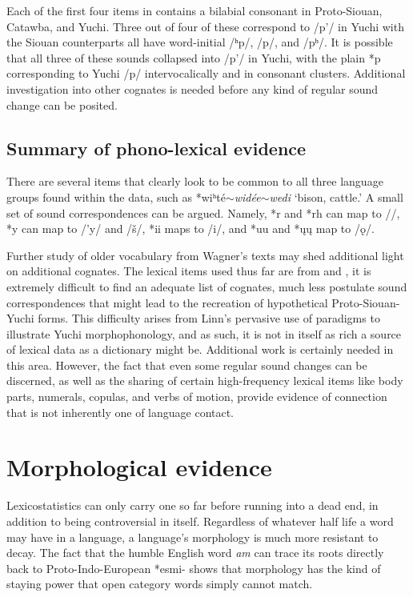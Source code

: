\documentclass[output=paper]{LSP/langsci}
\begin{document}
Each of the first four items in  contains a bilabial consonant in Proto-Siouan, Catawba, and Yuchi. Three out of four of these correspond to /p'/ in Yuchi with the Siouan counterparts all have word-initial /ʰp/, /p/, and /pʰ/. It is possible that all three of these sounds collapsed into /p'/ in Yuchi, with the plain *p corresponding to Yuchi /p/ intervocalically and in consonant clusters. Additional investigation into other cognates is needed before any kind of regular sound change can be posited.

\subsection{Summary of phono-lexical evidence}

There are several items that clearly look to be common to all three language groups found within the data, such as *wiʰt\'e$\sim$\emph{wid\'ee}$\sim$\emph{wedi} `bison, cattle.' A small set of sound correspondences can be argued. Namely, *r and *rh can map to /\textbeltl/, *y can map to /'y/ and /\v{s}/, *ii maps to /i/, and *uu and *\k{u}\k{u} map to /\k{o}/. 

Further study of older vocabulary from Wagner's \citeyear{Wagner1931} texts may shed additional light on additional cognates. The lexical items used thus far are from \citet{Linn2000} and \citet{CarterEtAlND}, it is extremely difficult to find an adequate list of cognates, much less postulate sound correspondences that might lead to the recreation of hypothetical Proto-Siouan-Yuchi forms. This difficulty arises from Linn's pervasive use of paradigms to illustrate Yuchi morphophonology, and as such, it is not in itself as rich a source of lexical data as a dictionary might be. Additional work is certainly needed in this area. However, the fact that even some regular sound changes can be discerned, as well as the sharing of certain high-frequency lexical items like body parts, numerals, copulas, and verbs of motion, provide evidence of connection that is not inherently one of language contact.

\section{Morphological evidence}\label{sec:kasak:5}

Lexicostatistics can only carry one so far before running into a dead end, in addition to being controversial in itself. Regardless of whatever half life a word may have in a language, a language's morphology is much more resistant to decay. The fact that the humble English word \textit{am} can trace its roots directly back to Proto-Indo-European *esmi- shows that morphology has the kind of staying power that open category words simply cannot match.
\end{document}
